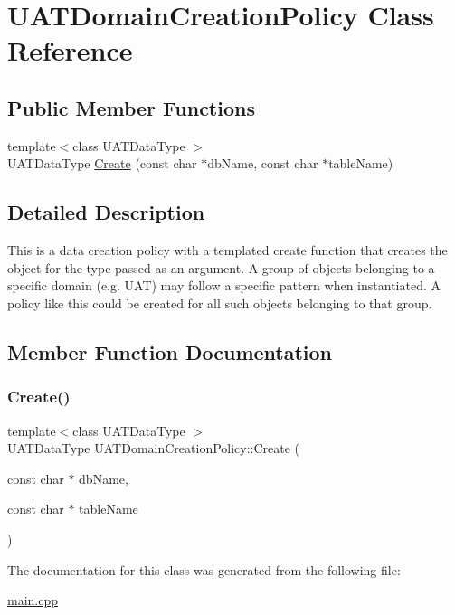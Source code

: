 \hypertarget{classUATDomainCreationPolicy}{}\section{U\+A\+T\+Domain\+Creation\+Policy Class Reference}
\label{classUATDomainCreationPolicy}
\subsection*{Public Member Functions}
\begin{DoxyCompactItemize}
\item 
{\footnotesize template$<$class U\+A\+T\+Data\+Type $>$ }\\U\+A\+T\+Data\+Type \mbox{\hyperlink{classUATDomainCreationPolicy_aced51b57b642cca926a77e90fbb7bfd3}{Create}} (const char $\ast$db\+Name, const char $\ast$table\+Name)
\end{DoxyCompactItemize}


\subsection{Detailed Description}
This is a data creation policy with a templated create function that creates the object for the type passed as an argument. A group of objects belonging to a specific domain (e.\+g. U\+AT) may follow a specific pattern when instantiated. A policy like this could be created for all such objects belonging to that group. 

\subsection{Member Function Documentation}
\mbox{\label{classUATDomainCreationPolicy_aced51b57b642cca926a77e90fbb7bfd3}} 
\subsubsection{\texorpdfstring{Create()}{Create()}}
{\footnotesize\ttfamily template$<$class U\+A\+T\+Data\+Type $>$ \\
U\+A\+T\+Data\+Type U\+A\+T\+Domain\+Creation\+Policy\+::\+Create (\begin{DoxyParamCaption}\item[{const char $\ast$}]{db\+Name,  }\item[{const char $\ast$}]{table\+Name }\end{DoxyParamCaption})\hspace{0.3cm}{\ttfamily [inline]}}



The documentation for this class was generated from the following file\+:\begin{DoxyCompactItemize}
\item 
\mbox{\hyperlink{main_8cpp}{main.\+cpp}}\end{DoxyCompactItemize}
